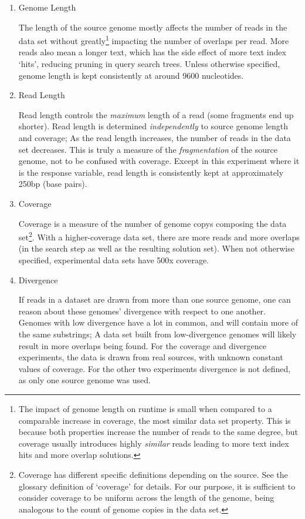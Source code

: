 \begin{enumerate}
\item Genome Length

The length of the \gls{source genome} mostly affects the number of \glspl{read} in the data set without greatly\footnote{The impact of genome length on runtime is small when compared to a comparable increase in coverage, the most similar data set property. This is because both properties increase the number of reads to the same degree, but coverage usually introduces highly \textit{similar} reads leading to more text index hits and more overlap solutions.} impacting the number of overlaps per read. More reads also mean a longer \gls{text}, which has the side effect of more text index `hits', reducing pruning in query search trees. Unless otherwise specified, genome length is kept consistently at around 9600 nucleotides.

\item Read Length

Read length controls the \textit{maximum} length of a read (some fragments end up shorter). Read length is determined \textit{independently} to source genome length and \gls{coverage}; As the read length increases, the number of reads in the data set decreases. This is truly a measure of the \textit{fragmentation} of the source genome, not to be confused with coverage. Except in this experiment where it is the response variable, read length is consistently kept at approximately 250bp  (base pairs).

\item Coverage

Coverage is a measure of the number of \glspl{genome copy} composing the data set\footnote{Coverage has different specific definitions depending on the source. See the glossary definition of `coverage' for details. For our purpose, it is sufficient to consider coverage to be uniform across the length of the genome, being analogous to the count of genome copies in the data set.}. With a higher-coverage data set, there are more reads and more overlaps (in the \gls{search step} as well as the resulting \gls{solution} set). When not otherwise specified, experimental data sets have 500x coverage.

\item Divergence

If reads in a dataset are drawn from more than one source genome, one can reason about these genomes' divergence with respect to one another. Genomes with low divergence have a lot in common, and will contain more of the same substrings; A data set built from low-divergence genomes will likely result in more overlaps being found. For the coverage and divergence experiments, the data is drawn from real sources, with unknown constant values of coverage. For the other two experiments divergence is not defined, as only one source genome was used.

\end{enumerate}

